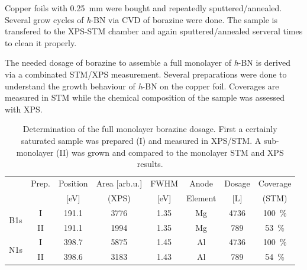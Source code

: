 Copper foils with \SI{0.25}{\mm} were bought and repeatedly sputtered/annealed. Several grow cycles of \textit{h}-BN via CVD of borazine were done.  The sample is transfered to the XPS-STM chamber and again sputtered/annealed serveral times to clean it properly.

The needed dosage of borazine to assemble a full monolayer of \textit{h}-BN is derived via a combinated STM/XPS measurement. Several preparations were done to understand the growth behaviour of \textit{h}-BN on the copper foil. Coverages are measured in STM while the chemical composition of the sample was assessed with XPS.
\begin{table}[h!]
\centering
\caption{Determination of the full monolayer borazine dosage. First a certainly saturated sample was prepared (I) and measured in XPS/STM. A sub-monolayer (II) was grown and compared to the monolayer STM and XPS results.}
 \begin{tabular}{cccccccc}
  & Prep. & Position    & Area [arb.u.] & FWHM  & Anode & Dosage  & Coverage\\ 
  &	  &	[eV]	& (XPS)		&[eV]	&Element&[L]	  & (STM) \\ \hline \hline
  \multirow{2}{*}{B1s} 	&I& 191.1 & 3776 & 1.35 & Mg & 4736 & \SI{100}{\percent}\\
    			&II& 191.1 & 1994 & 1.35 & Mg & 789 &\SI{53}{\percent}\\ \hline
  \multirow{2}{*}{N1s} 	&I& 398.7 & 5875 & 1.45 & Al  & 4736 & \SI{100}{\percent}\\
 			&II& 398.6 & 3183 & 1.43 & Al & 789 &\SI{54}{\percent}\\
 \end{tabular}
\end{table}

